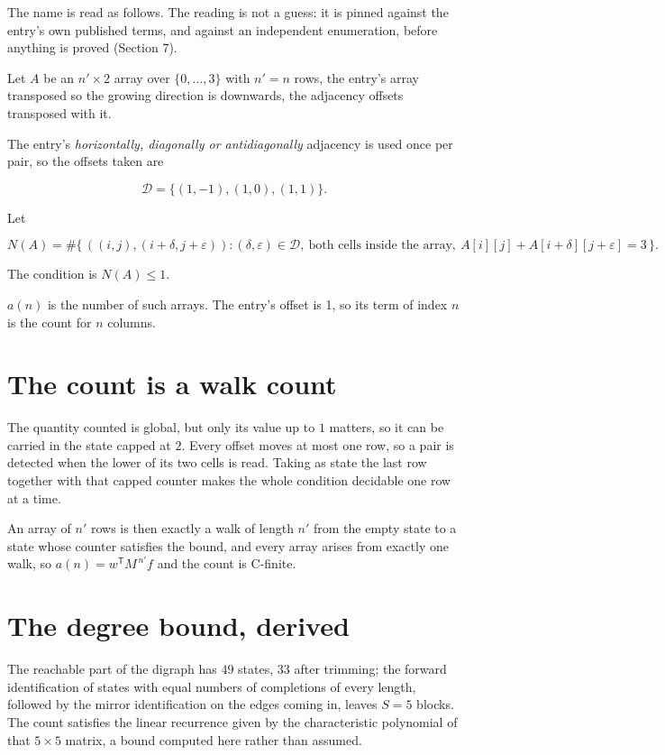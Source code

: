 \documentclass[11pt]{article}
\theoremstyle{definition}
\begin{document}
The name is read as follows. The reading is not a guess: it is pinned against the entry's own published terms, and against an independent enumeration, before anything is proved (Section 7).

Let $A$ be an $n' \times 2$ array over $\{0,\dots,3\}$ with $n' = n$ rows, the entry's array transposed so the growing direction is downwards, the adjacency offsets transposed with it.

The entry's {\itshape horizontally, diagonally or antidiagonally} adjacency is used once per pair, so the offsets taken are

\[\mathcal{D} = \{(1,-1), (1,0), (1,1)\}.\]

Let

\[N(A) = \#\bigl\{\,((i,j),(i{+}\delta,j{+}\varepsilon)) : (\delta,\varepsilon) \in \mathcal{D},\ \text{both cells inside the array},\ A[i][j] + A[i{+}\delta][j{+}\varepsilon] = 3\,\bigr\}.\]

The condition is $N(A) \le 1$.

$a(n)$ is the number of such arrays. The entry's offset is 1, so its term of index $n$ is the count for $n$ columns.

\section{The count is a walk count}

The quantity counted is global, but only its value up to $1$ matters, so it can be carried in the state capped at $2$. Every offset moves at most one row, so a pair is detected when the lower of its two cells is read. Taking as state the last row together with that capped counter makes the whole condition decidable one row at a time.

An array of $n'$ rows is then exactly a walk of length $n'$ from the empty state to a state whose counter satisfies the bound, and every array arises from exactly one walk, so $a(n) = w^{\mathsf T}M^{\,n'}f$ and the count is C-finite.

\section{The degree bound, derived}

The reachable part of the digraph has $49$ states, $33$ after trimming; the forward identification of states with equal numbers of completions of every length, followed by the mirror identification on the edges coming in, leaves $S = 5$ blocks. The count satisfies the linear recurrence given by the characteristic polynomial of that $5\times5$ matrix, a bound computed here rather than assumed.
\end{document}
